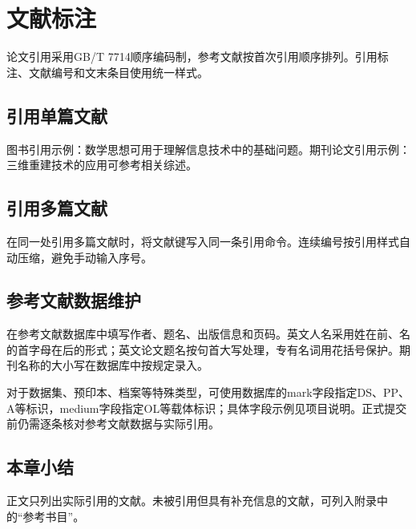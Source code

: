 \chapter{文献标注}
论文引用采用GB/T 7714顺序编码制，参考文献按首次引用顺序排列。引用标注、文献编号和文末条目使用统一样式。
\section{引用单篇文献}
图书引用示例：数学思想可用于理解信息技术中的基础问题\cite{wu2012}。期刊论文引用示例：三维重建技术的应用可参考相关综述\cite{ma2018}。
\section{引用多篇文献}
在同一处引用多篇文献时，将文献键写入同一条引用命令\cite{wu2012,ma2018,chen2022}。连续编号按引用样式自动压缩，避免手动输入序号。
\section{参考文献数据维护}
在参考文献数据库中填写作者、题名、出版信息和页码。英文人名采用姓在前、名的首字母在后的形式；英文论文题名按句首大写处理，专有名词用花括号保护。期刊名称的大小写在数据库中按规定录入。

对于数据集、预印本、档案等特殊类型，可使用数据库的mark字段指定DS、PP、A等标识，medium字段指定OL等载体标识；具体字段示例见项目说明。正式提交前仍需逐条核对参考文献数据与实际引用。
\section{本章小结}
正文只列出实际引用的文献。未被引用但具有补充信息的文献，可列入附录中的“参考书目”。

